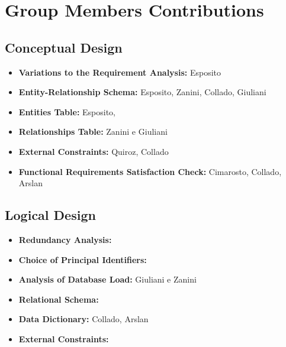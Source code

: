 \section{Group Members Contributions}


\subsection{Conceptual Design}
\begin{itemize}
	\item \textbf{Variations to the Requirement Analysis:} Esposito
	\item \textbf{Entity-Relationship Schema:} Esposito, Zanini, Collado, Giuliani 
	\item \textbf{Entities Table:} Esposito, 
	\item \textbf{Relationships Table:} Zanini e Giuliani
	\item \textbf{External Constraints:} Quiroz, Collado
	\item \textbf{Functional Requirements Satisfaction Check:} Cimarosto, Collado, Arslan
\end{itemize}

\subsection{Logical Design}
\begin{itemize}
	\item \textbf{Redundancy Analysis:} 
	\item \textbf{Choice of Principal Identifiers:}
	\item \textbf{Analysis of Database Load:} Giuliani e Zanini
	\item \textbf{Relational Schema:}
	\item \textbf{Data Dictionary:} Collado, Arslan
	\item \textbf{External Constraints:}
\end{itemize}	